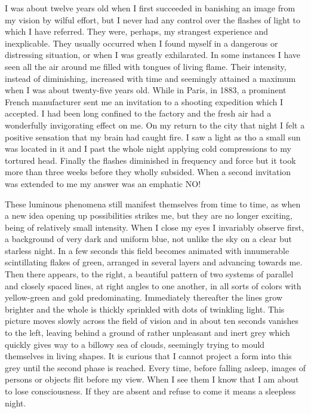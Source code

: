 \documentclass[a4paper,12pt,english,twoside,openright]{memoir}
\begin{document}
	I was about twelve years old when I first succeeded in banishing an image from my vision by 
	wilful effort, but I never had any control over the flashes of light to which I have referred.  They 
	were, perhaps, my strangest experience and inexplicable.  They usually occurred when I found 
	myself in a dangerous or distressing situation, or when I was greatly exhilarated.  In some 
	instances I have seen all the air around me filled with tongues of living flame.  Their intensity, 
	instead of diminishing, increased with time and seemingly attained a maximum when I was about 
	twenty-five years old.  While in Paris, in 1883, a prominent French manufacturer sent me an 
	invitation to a shooting expedition which I accepted.  I had been long confined to the factory and 
	the fresh air had a wonderfully invigorating effect on me.  On my return to the city that night I felt a 
	positive sensation that my brain had caught fire.  I saw a light as tho a small sun was located in it 
	and I past the whole night applying cold compressions to my tortured head.  Finally the flashes 
	diminished in frequency and force but it took more than three weeks before they wholly subsided.  
	When a second invitation was extended to me my answer was an emphatic NO! 
	
	These luminous phenomena still manifest themselves from time to time, as when a new idea 
	opening up possibilities strikes me, but they are no longer exciting, being of relatively small 
	intensity.  When I close my eyes I invariably observe first, a background of very dark and uniform 
	blue, not unlike the sky on a clear but starless night.  In a few seconds this field becomes 
	animated with innumerable scintillating flakes of green, arranged in several layers and advancing 
	towards me.  Then there appears, to the right, a beautiful pattern of two systems of parallel and 
	closely spaced lines, at right angles to one another, in all sorts of colors with yellow-green and 
	gold predominating.  Immediately thereafter the lines grow brighter and the whole is thickly 
	sprinkled with dots of twinkling light.  This picture moves slowly across the field of vision and in 
	about ten seconds vanishes to the left, leaving behind a ground of rather unpleasant and inert 
	grey which quickly gives way to a billowy sea of clouds, seemingly trying to mould themselves in 
	living shapes.  It is curious that I cannot project a form into this grey until the second phase is 
	reached.  Every time, before falling asleep, images of persons or objects flit before my view.  
	When I see them I know that I am about to lose consciousness.  If they are absent and refuse to 
	come it means a sleepless night.  
	
\end{document}
